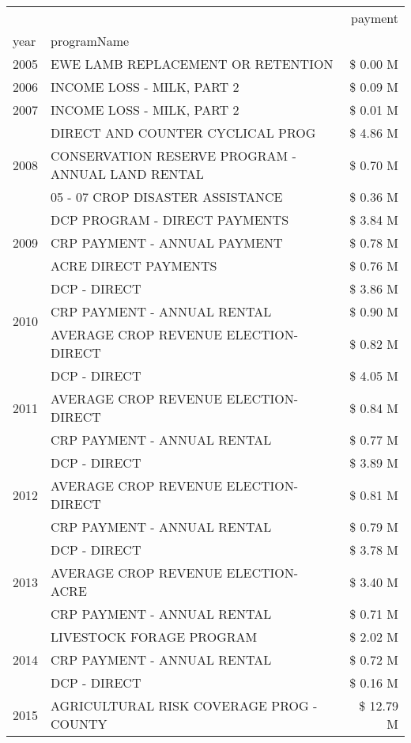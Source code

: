 \begin{tabular}{llr}
\toprule
 &  & payment \\
year & programName &  \\
\midrule
2005 & EWE LAMB REPLACEMENT OR RETENTION & \$ 0.00 M \\
\cline{1-3}
2006 & INCOME LOSS - MILK, PART 2 & \$ 0.09 M \\
\cline{1-3}
2007 & INCOME LOSS - MILK, PART 2 & \$ 0.01 M \\
\cline{1-3}
\multirow[t]{3}{*}{2008} & DIRECT AND COUNTER CYCLICAL PROG & \$ 4.86 M \\
 & CONSERVATION RESERVE PROGRAM - ANNUAL LAND RENTAL & \$ 0.70 M \\
 & 05 - 07 CROP DISASTER ASSISTANCE & \$ 0.36 M \\
\cline{1-3}
\multirow[t]{3}{*}{2009} & DCP PROGRAM - DIRECT PAYMENTS & \$ 3.84 M \\
 & CRP PAYMENT - ANNUAL PAYMENT & \$ 0.78 M \\
 & ACRE DIRECT PAYMENTS & \$ 0.76 M \\
\cline{1-3}
\multirow[t]{3}{*}{2010} & DCP - DIRECT & \$ 3.86 M \\
 & CRP PAYMENT - ANNUAL RENTAL & \$ 0.90 M \\
 & AVERAGE CROP REVENUE ELECTION-DIRECT & \$ 0.82 M \\
\cline{1-3}
\multirow[t]{3}{*}{2011} & DCP - DIRECT & \$ 4.05 M \\
 & AVERAGE CROP REVENUE ELECTION-DIRECT & \$ 0.84 M \\
 & CRP PAYMENT - ANNUAL RENTAL & \$ 0.77 M \\
\cline{1-3}
\multirow[t]{3}{*}{2012} & DCP - DIRECT & \$ 3.89 M \\
 & AVERAGE CROP REVENUE ELECTION-DIRECT & \$ 0.81 M \\
 & CRP PAYMENT - ANNUAL RENTAL & \$ 0.79 M \\
\cline{1-3}
\multirow[t]{3}{*}{2013} & DCP - DIRECT & \$ 3.78 M \\
 & AVERAGE CROP REVENUE ELECTION-ACRE & \$ 3.40 M \\
 & CRP PAYMENT - ANNUAL RENTAL & \$ 0.71 M \\
\cline{1-3}
\multirow[t]{3}{*}{2014} & LIVESTOCK FORAGE PROGRAM & \$ 2.02 M \\
 & CRP PAYMENT - ANNUAL RENTAL & \$ 0.72 M \\
 & DCP - DIRECT & \$ 0.16 M \\
\cline{1-3}
\multirow[t]{3}{*}{2015} & AGRICULTURAL RISK COVERAGE PROG - COUNTY & \$ 12.79 M \\

\end{tabular}
